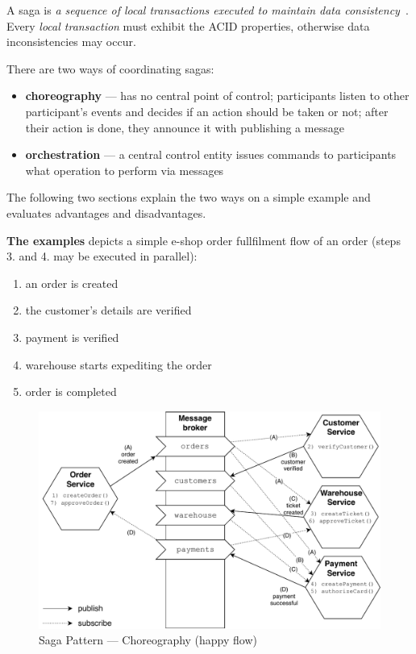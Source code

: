 \documentclass[thesis=M,english,hidelinks]{FITthesis}[2012/10/20]
\begin{document}
A saga is \textit{a sequence of local transactions executed to maintain data consistency}~\cite{sagas}. Every \textit{local transaction} must exhibit the \acrshort{ACID} properties, otherwise data inconsistencies may occur.

\vspace{1em}
\noindent
There are two ways of coordinating sagas:
\begin{itemize}
    \item \textbf{choreography} --- has no central point of control; participants listen to other participant's events and decides if an action should be taken or not; after their action is done, they announce it with publishing a message
    \item \textbf{orchestration} --- a central control entity issues commands to participants what operation to perform via messages
\end{itemize}

The following two sections explain the two ways on a simple example and evaluates advantages and disadvantages.

\vspace{1em}
\noindent
\textbf{The examples} depicts a simple e-shop order fullfilment flow of an order (steps 3. and 4. may be executed in parallel):
\begin{multicols}{2}
   \begin{enumerate}[noitemsep]
        \item an order is created
        \item the customer's details are verified
        \item payment is verified
        \item warehouse starts expediting the order
        \item order is completed
    \end{enumerate} 
\end{multicols}

\begin{figure}[!ht]
  \centering
    \includegraphics[width=1\textwidth]{images/saga-chor-happy.pdf}
    \caption{Saga Pattern --- Choreography (happy flow)}
    \label{fig:saga-chor-happy}
\end{figure}
\end{document}
